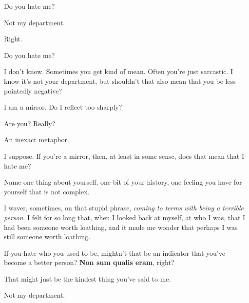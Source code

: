 \noindent Do you hate me?

\begin{ally}
Not my department.
\end{ally}
Right.

\begin{ally}
Do you hate me?
\end{ally}
I don't know. Sometimes you get kind of mean. Often you're just sarcastic. I know it's not your department, but shouldn't that also mean that you be less pointedly negative?

\begin{ally}
I am a mirror. Do I reflect too sharply?
\end{ally}
Are you? Really?

\begin{ally}
An inexact metaphor.
\end{ally}
I suppose. If you're a mirror, then, at least in some sense, does that mean that I hate me?

\begin{ally}
Name one thing about yourself, one bit of your history, one feeling you have for yourself that is not complex.
\end{ally}
I waver, sometimes, on that stupid phrase, \emph{coming to terms with being a terrible person}. I felt for so long that, when I looked back at myself, at who I was, that I had been someone worth loathing, and it made me wonder that perhaps I was still someone worth loathing.

\begin{ally}
If you hate who you used to be, mightn't that be an indicator that you've become a better person? \textbf{Non sum qualis eram}, right?
\end{ally}
That might just be the kindest thing you've said to me.

\begin{ally}
Not my department.
\end{ally}
\newpage
